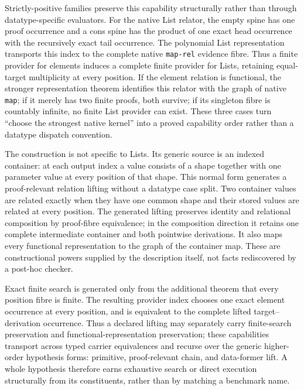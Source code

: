 \documentclass[11pt]{article}
\newcommand{\code}[1]{\texttt{#1}}
\begin{document}
Strictly-positive families preserve this capability structurally rather than
through datatype-specific evaluators.  For the native List relator, the empty
spine has one proof occurrence and a cons spine has the product of one exact
head occurrence with the recursively exact tail occurrence.  The polynomial
List representation transports this index to the complete native
\code{map-rel} evidence fibre.  Thus a finite provider for elements induces a
complete finite provider for Lists, retaining equal-target multiplicity at
every position.  If the element relation is functional, the stronger
representation theorem identifies this relator with the graph of native
\code{map}; if it merely has two finite proofs, both survive; if its singleton
fibre is countably infinite, no finite List provider can exist.  These three
cases turn ``choose the strongest native kernel'' into a proved capability
order rather than a datatype dispatch convention.

The construction is not specific to Lists.  Its generic source is an indexed
container: at each output index a value consists of a shape together with one
parameter value at every position of that shape.  This normal form generates a
proof-relevant relation lifting without a datatype case split.  Two container
values are related exactly when they have one common shape and their stored
values are related at every position.  The generated lifting preserves
identity and relational composition by proof-fibre equivalence; in the
composition direction it retains one complete intermediate container and both
pointwise derivations.  It also maps every functional representation to the
graph of the container map.  These are constructional powers supplied by the
description itself, not facts rediscovered by a post-hoc checker.

Exact finite search is generated only from the additional theorem that every
position fibre is finite.  The resulting provider index chooses one exact
element occurrence at every position, and is equivalent to the complete lifted
target--derivation occurrence.  Thus a declared lifting may separately carry
finite-search preservation and functional-representation preservation; these
capabilities transport across typed carrier equivalences and recurse over the
generic higher-order hypothesis forms: primitive, proof-relevant chain, and
data-former lift.  A whole hypothesis therefore earns exhaustive search or
direct execution structurally from its constituents, rather than by matching a
benchmark name.
\end{document}
